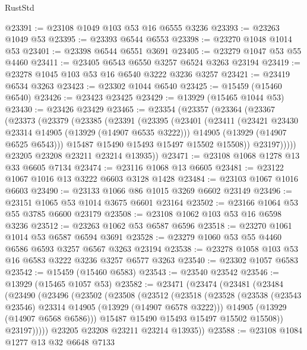 \begin{lexlean}{RustStd}
\begin{coremodule}
@23391 := @23108 @1049 @103 @53 @16 @6555 @3236
@23393 := @23263 @1049 @53
@23395 := @23393 @6544 @6553
@23398 := @23270 @1048 @1014 @53
@23401 := @23398 @6544 @6551 @3691
@23405 := @23279 @1047 @53 @55 @4460
@23411 := @23405 @6543 @6550 @3257 @6524 @3263 @23194
@23419 := @23278 @1045 @103 @53 @16 @6540 @3222 @3236 @3257
@23421 := @23419 @6534 @3263
@23423 := @23302 @1044 @6540
@23425 := @15459 (@15460 @6540)
@23426 := @23423 @23425
@23429 := @13929 (@15465 @1044 @53)
@23430 := @23426 @23429
@23465 := @23354
    (@23357
      (@23364
        (@23367
          (@23373
            (@23379
              (@23385
                (@23391
                  (@23395
                    (@23401
                      (@23411
                        (@23421 @23430 @23314 @14905 (@13929 (@14907 @6535 @3222)))
                        @14905
                        (@13929 (@14907 @6525 @6543)))
                      @15487
                      @15490
                      @15493
                      @15497
                      @15502
                      @15508))
                  @23197)))))
        @23205
        @23208
        @23211
        @23214
        @13935))
@23471 := @23108 @1068 @1278 @13 @33 @6605 @7134
@23474 := @23116 @1068 @13 @6605
@23481 := @23122 @1067 @1016 @13 @3222 @6603 @3128 @1428
@23484 := @23103 @1067 @1016 @6603
@23490 := @23133 @1066 @86 @1015 @3269 @6602 @23149
@23496 := @23151 @1065 @53 @1014 @3675 @6601 @23164
@23502 := @23166 @1064 @53 @55 @3785 @6600 @23179
@23508 := @23108 @1062 @103 @53 @16 @6598 @3236
@23512 := @23263 @1062 @53 @6587 @6596
@23518 := @23270 @1061 @1014 @53 @6587 @6594 @3691
@23528 := @23279 @1060 @53 @55 @4460 @6586 @6593 @3257 @6567 @3263 @23194
@23538 := @23278 @1058 @103 @53 @16 @6583 @3222 @3236 @3257 @6577 @3263
@23540 := @23302 @1057 @6583
@23542 := @15459 (@15460 @6583)
@23543 := @23540 @23542
@23546 := @13929 (@15465 @1057 @53)
@23582 := @23471
    (@23474
      (@23481
        (@23484
          (@23490
            (@23496
              (@23502
                (@23508
                  (@23512
                    (@23518
                      (@23528
                        (@23538 (@23543 @23546) @23314 @14905 (@13929 (@14907 @6578 @3222)))
                        @14905
                        (@13929 (@14907 @6568 @6586)))
                      @15487
                      @15490
                      @15493
                      @15497
                      @15502
                      @15508))
                  @23197)))))
        @23205
        @23208
        @23211
        @23214
        @13935))
@23588 := @23108 @1084 @1277 @13 @32 @6648 @7133

\end{coremodule}
\end{lexlean}
